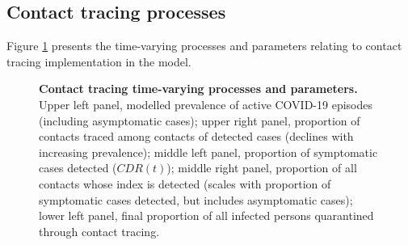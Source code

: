 

\subsection{Contact tracing processes}
Figure \ref{fig:tracing} presents the time-varying processes and parameters relating to contact tracing implementation in the model.

\begin{figure}[ht]
    \caption{\textbf{Contact tracing time-varying processes and parameters.} Upper left panel, modelled prevalence of active COVID-19 episodes (including asymptomatic cases); upper right panel, proportion of contacts traced among contacts of detected cases (declines with increasing prevalence); middle left panel, proportion of symptomatic cases detected (\(CDR(t)\)); middle right panel, proportion of all contacts whose index is detected (scales with proportion of symptomatic cases detected, but includes asymptomatic cases); lower left panel, final proportion of all infected persons quarantined through contact tracing.}
    \label{fig:tracing}
\end{figure}
